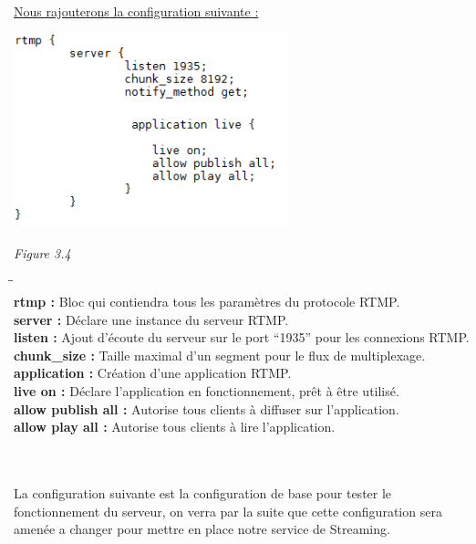 \documentclass{report}
\begin{document}
    \underline{Nous rajouterons la configuration suivante : }\\
    

   \begin{center}
    \includegraphics[width=8cm]{img/conf1.PNG}
    
    \textit{\small{Figure 3.4}}
    \end{center}


\begin{tabbing}
\hspace{4cm}\=\hspace{2cm}\=\kill
\\
\textbf{rtmp :} \> Bloc qui contiendra tous les paramètres du protocole RTMP.\\
\textbf{server : }\> Déclare une instance du serveur RTMP.\\
\textbf{listen :}\>  Ajout d’écoute du serveur sur le port “1935” pour les connexions RTMP.\\
\textbf{chunk\_size :}\>   Taille maximal d’un segment pour le flux de multiplexage.\\
\textbf{application :}\>   Création d’une application RTMP.\\
\textbf{live on :}\> Déclare l’application en fonctionnement, prêt à être utilisé.\\
\textbf{allow publish all :}\>   Autorise tous clients à diffuser sur l’application.\\
\textbf{allow play all :}\> Autorise tous clients à lire l’application.\\
    
    \end{tabbing}

    
    \\
    \\
    La configuration suivante est la configuration de base pour tester le fonctionnement du serveur, on verra par la suite que cette configuration sera amenée a changer pour mettre en place notre service de Streaming.
    \\
    \\
    
\end{document}

